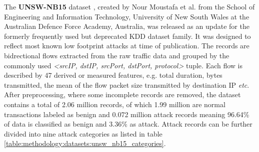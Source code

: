 The \textbf{UNSW-NB15} dataset \cite{unsw_nb15}, created by Nour Moustafa et al. from the School of Engineering and Information Technology, University of New South Wales at the Australian Defence Force Academy, Australia, was released as an update for the formerly frequently used but deprecated \cite{unsw_nb15} KDD dataset family. It was designed to reflect most known low footprint attacks at time of publication. The records are bidrectional flows extracted from the raw traffic data and grouped by the commonly used \textit{<srcIP, dstIP, srcPort, dstPort, protocol>} tuple. Each flow is described by 47 derived or measured features, e.g. total duration, bytes transmitted, the mean of the flow packet size transmitted by destination IP \textit{etc}. After preprocessing, where some incomplete records are removed, the dataset contains a total of 2.06 million records, of which 1.99 million are normal transactions labeled as benign and 0.072 million attack records meaning 96.64\% of data is classified as benign and 3.36\% as attack. Attack records can be further divided into nine attack categories as listed in table \ref{table:methodology:datasets:unsw_nb15_categories}.


